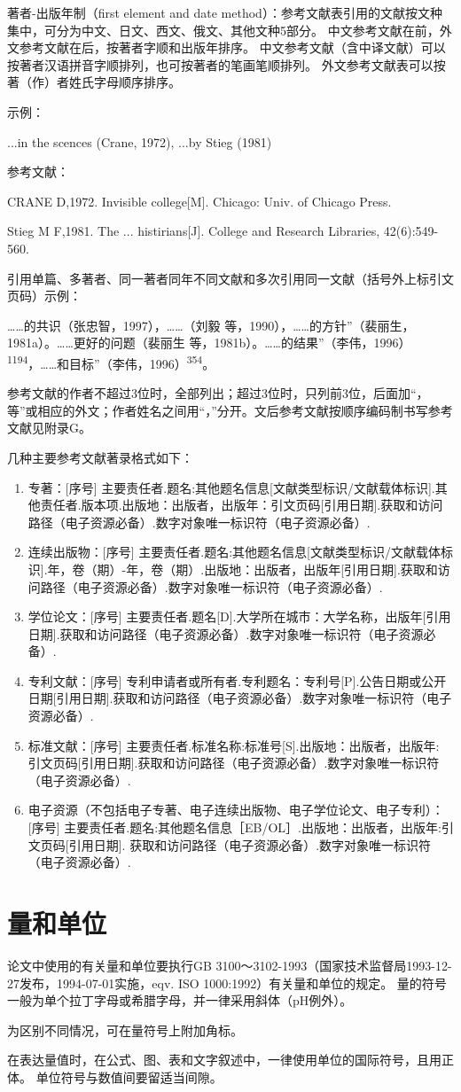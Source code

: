 著者-出版年制（first element and date method）：参考文献表引用的文献按文种集中，可分为中文、日文、西文、俄文、其他文种5部分。
中文参考文献在前，外文参考文献在后，按著者字顺和出版年排序。
中文参考文献（含中译文献）可以按著者汉语拼音字顺排列，也可按著者的笔画笔顺排列。
外文参考文献表可以按著（作）者姓氏字母顺序排序。

示例：

...in the scences (Crane, 1972), ...by Stieg (1981)

参考文献：

CRANE D,1972. Invisible college[M]. Chicago: Univ. of Chicago Press.

Stieg M F,1981. The ... histirians[J]. College and Research Libraries, 42(6):549-560.

引用单篇、多著者、同一著者同年不同文献和多次引用同一文献（括号外上标引文页码）示例：

……的共识（张忠智，1997），……（刘毅 等，1990），……的方针”（裴丽生，1981a）。……更好的问题（裴丽生 等，1981b）。……的结果”（李伟，1996）\textsuperscript{1194}，……和目标”（李伟，1996）\textsuperscript{354}。

参考文献的作者不超过3位时，全部列出；超过3位时，只列前3位，后面加“，等”或相应的外文；作者姓名之间用“，”分开。文后参考文献按顺序编码制书写参考文献见附录G。

几种主要参考文献著录格式如下：

\begin{enumerate}
    \item 专著：[序号] 主要责任者.题名:其他题名信息[文献类型标识/文献载体标识].其他责任者.版本项.出版地：出版者，出版年：引文页码[引用日期].获取和访问路径（电子资源必备）.数字对象唯一标识符（电子资源必备）.
    \item 连续出版物：[序号] 主要责任者.题名:其他题名信息[文献类型标识/文献载体标识].年，卷（期）-年，卷（期）.出版地：出版者，出版年[引用日期].获取和访问路径（电子资源必备）.数字对象唯一标识符（电子资源必备）.
    \item 学位论文：[序号] 主要责任者.题名[D].大学所在城市：大学名称，出版年[引用日期].获取和访问路径（电子资源必备）.数字对象唯一标识符（电子资源必备）.
    \item 专利文献：[序号] 专利申请者或所有者.专利题名：专利号[P].公告日期或公开日期[引用日期].获取和访问路径（电子资源必备）.数字对象唯一标识符（电子资源必备）.
    \item 标准文献：[序号] 主要责任者.标准名称:标准号[S].出版地：出版者，出版年: 引文页码[引用日期].获取和访问路径（电子资源必备）.数字对象唯一标识符（电子资源必备）.
    \item 电子资源（不包括电子专著、电子连续出版物、电子学位论文、电子专利）：[序号] 主要责任者.题名:其他题名信息［EB/OL］.出版地：出版者，出版年:引文页码[引用日期]. 获取和访问路径（电子资源必备）.数字对象唯一标识符（电子资源必备）.
\end{enumerate}

\section{量和单位}

论文中使用的有关量和单位要执行GB 3100～3102-1993（国家技术监督局1993-12-27发布，1994-07-01实施，eqv. ISO 1000:1992）有关量和单位的规定。
量的符号一般为单个拉丁字母或希腊字母，并一律采用斜体（pH例外）。

为区别不同情况，可在量符号上附加角标。

在表达量值时，在公式、图、表和文字叙述中，一律使用单位的国际符号，且用正体。
单位符号与数值间要留适当间隙。
